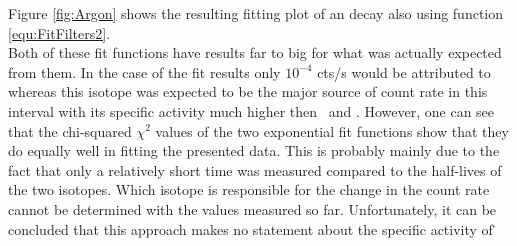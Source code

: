 Figure \ref{fig:Argon} shows the resulting fitting plot of an  decay also using function \ref{equ:FitFilters2}.
\\

Both of these fit functions have results far to big for what was actually expected from them.
In the case of the  fit results only $10^{-4}$ cts/s would be attributed to  whereas this isotope was expected to be the major source of count rate in this interval with its specific activity much higher then \Kr\ and .
However, one can see that the chi-squared $\chi^2$ values of the two exponential fit functions show that they do equally well in fitting the presented data.
This is probably mainly due to the fact that only a relatively short time was measured compared to the half-lives of the two isotopes.
Which isotope is responsible for the change in the count rate cannot be determined with the values measured so far.
Unfortunately, it can be concluded that this approach makes no statement about the specific activity of \Kr\.



